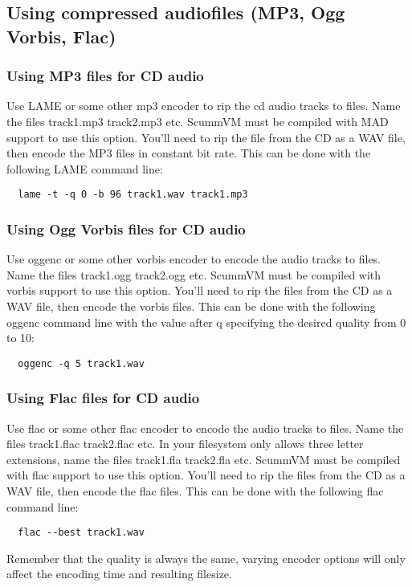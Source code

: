 

\subsection{Using compressed audiofiles (MP3, Ogg Vorbis, Flac)}

\subsubsection{Using MP3 files for CD audio}

Use LAME or some other mp3 encoder to rip the cd audio tracks to files. Name
the files track1.mp3 track2.mp3 etc. ScummVM must be compiled with MAD support
to use this option. You'll need to rip the file from the CD as a WAV file,
then encode the MP3 files in constant bit rate. This can be done with the 
following LAME command line:
\begin{verbatim}
  lame -t -q 0 -b 96 track1.wav track1.mp3
\end{verbatim}


\subsubsection{Using Ogg Vorbis files for CD audio}

Use oggenc or some other vorbis encoder to encode the audio tracks to files.
Name the files track1.ogg track2.ogg etc. ScummVM must be compiled with vorbis
support to use this option. You'll need to rip the files from the CD as a WAV
file, then encode the vorbis files. This can be done with the following oggenc
command line with the value after q specifying the desired quality from 0 to 10:
\begin{verbatim}
  oggenc -q 5 track1.wav
\end{verbatim}


\subsubsection{Using Flac files for CD audio}
Use flac or some other flac encoder to encode the audio tracks to files.
Name the files track1.flac track2.flac etc. In your filesystem only allows 
three letter extensions, name the files track1.fla track2.fla etc. 
ScummVM must be compiled with flac support to use this option. You'll need to 
rip the files from the CD as a WAV file, then encode the flac files. This can 
be done with the following flac command line:
\begin{verbatim}
  flac --best track1.wav
\end{verbatim}
%
Remember that the quality is always the same, varying encoder options will only
affect the encoding time and resulting filesize. 


